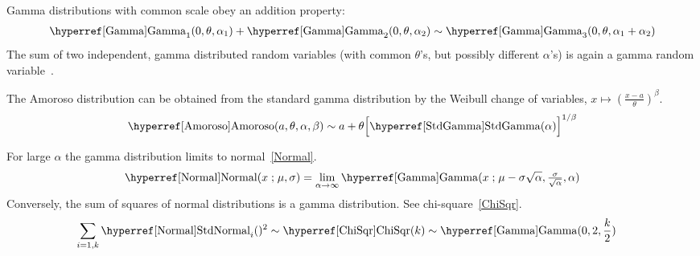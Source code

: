 Gamma distributions with common scale obey an addition property:
\begin{align*}
\opr{Gamma}_1(0, \theta, \alpha_1) +  \opr{Gamma}_2(0, \theta,\alpha_2) \sim \opr{Gamma}_3(0, \theta,\alpha_1+\alpha_2)
\checked
\end{align*}
The  sum of two independent, gamma distributed random variables (with common $\theta$'s, but possibly different $\alpha$'s) is again a gamma random variable~\cite{Johnson1994}.

The Amoroso distribution can be obtained from the standard gamma distribution by the Weibull change of variables, $x \mapsto \left(\tfrac{x-a}{\theta}\right)^\beta$.
\[
\opr{Amoroso}(a ,\theta,\alpha,\beta) \sim
a+\theta \Big[{\opr{StdGamma}}(\alpha)\Big]^{1/\beta} 
\checked
\]


For large $\alpha$ the gamma distribution limits to normal~\eqref{Normal}.
\[
\opr{Normal}(x\given \mu,\sigma)   = 
\lim_{\alpha\rightarrow\infty} \opr{Gamma} (x\given  \mu- \sigma\sqrt{\alpha}, \tfrac{\sigma}{\sqrt{\alpha}}, \alpha)
\checked %
\]
Conversely, the sum of squares of normal distributions is a gamma distribution. See chi-square~\eqref{ChiSqr}.
\begin{align*}
\sum_{i=1,k}\oprr{StdNormal}{Normal}_i()^{2} & \sim \opr{ChiSqr}(k)  
 \sim \opr{Gamma}(0, 2,\frac{k}{2})  
 \checked
\end{align*}



